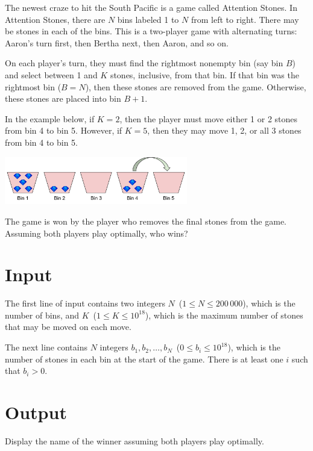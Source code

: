 
The newest craze to hit the South Pacific is a game called Attention Stones. In Attention Stones, there are $N$ bins labeled 1 to $N$ from left to right. There may be stones in each of the bins. This is a two-player game with alternating turns: Aaron's turn first, then Bertha next, then Aaron, and so on.

On each player's turn, they must find the rightmost nonempty bin (say bin $B$) and select between 1 and $K$ stones, inclusive, from that bin. If that bin was the rightmost bin ($B = N$), then these stones are removed from the game. Otherwise, these stones are placed into bin $B + 1$.

In the example below, if $K=2$, then the player must move either 1 or 2 stones from bin 4 to bin 5. However, if $K=5$, then they may move 1, 2, or all 3 stones from bin 4 to bin 5.

\begin{center}
 \includegraphics[width=0.6\textwidth]{AttentionStones}
\end{center}

The game is won by the player who removes the final stones from the game. Assuming both players play optimally, who wins?


\section*{Input}

The first line of input contains two integers $N$~($1 \leq N \leq 200\,000$), which is the number of bins, and $K$~($1 \leq K \leq 10^{18}$), which is the maximum number of stones that may be moved on each move.

The next line contains $N$ integers $b_1, b_2, \dots, b_N$~($0 \leq b_i \leq 10^{18}$), which is the number of stones in each bin at the start of the game. There is at least one $i$ such that $b_i > 0$.


\section*{Output}

Display the name of the winner assuming both players play optimally.

